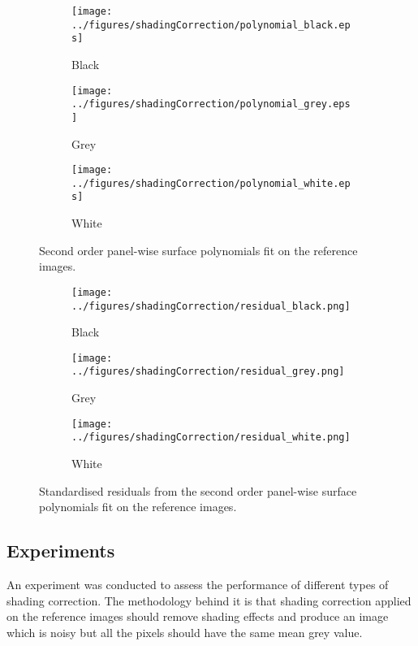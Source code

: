 \documentclass[a4paper]{proc}
\begin{document}
\begin{figure*}
	\centering
	\begin{subfigure}{0.45\textwidth}
		\centering
		\texttt{[image: ../figures/shadingCorrection/polynomial\_black.eps]}
		\caption{Black}
	\end{subfigure}
	\begin{subfigure}{0.45\textwidth}
		\centering
		\texttt{[image: ../figures/shadingCorrection/polynomial\_grey.eps]}
		\caption{Grey}
	\end{subfigure}
	\begin{subfigure}{0.45\textwidth}
		\centering
		\texttt{[image: ../figures/shadingCorrection/polynomial\_white.eps]}
		\caption{White}
	\end{subfigure}
	\caption{Second order panel-wise surface polynomials fit on the reference images.}
	\label{fig:polynomial_shadingCorrection}
\end{figure*}

\begin{figure*}
	\centering
	\begin{subfigure}{0.45\textwidth}
		\centering
		\texttt{[image: ../figures/shadingCorrection/residual\_black.png]}
		\caption{Black}
	\end{subfigure}
	\begin{subfigure}{0.45\textwidth}
		\centering
		\texttt{[image: ../figures/shadingCorrection/residual\_grey.png]}
		\caption{Grey}
	\end{subfigure}
	\begin{subfigure}{0.45\textwidth}
		\centering
		\texttt{[image: ../figures/shadingCorrection/residual\_white.png]}
		\caption{White}
	\end{subfigure}
	\caption{Standardised residuals from the second order panel-wise surface polynomials fit on the reference images.}
	\label{fig:polynomial_residual}
\end{figure*}

\subsection{Experiments}

An experiment was conducted to assess the performance of different types of shading correction. The methodology behind it is that shading correction applied on the reference images should remove shading effects and produce an image which is noisy but all the pixels should have the same mean grey value.
\end{document}

